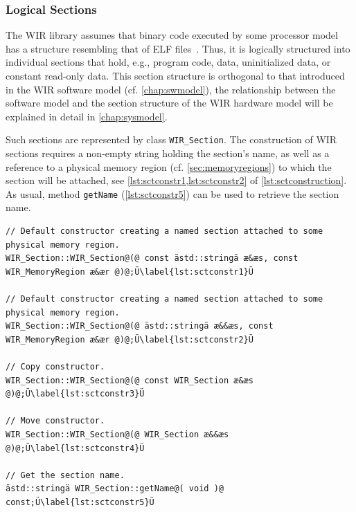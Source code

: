 \subsubsection{Logical Sections}
\label{sssec:sections}

The \gls{WIR} library assumes that binary code executed by some processor model has a structure resembling that of \gls{ELF} files~\cite{elf95}.
Thus, it is logically structured into individual sections that hold, e.g., program code, data, uninitialized data, or constant read-only data.
This section structure is orthogonal to that introduced in the \gls{WIR} software model (cf. \cref{chap:swmodel}), the relationship between the software model and the section structure of the \gls{WIR} hardware model will be explained in detail in \cref{chap:sysmodel}.

Such sections are represented by class \texttt{WIR\_Section}.
The construction of \gls{WIR} sections requires a non-empty string holding the section's name, as well as a reference to a physical memory region (cf. \cref{sec:memoryregions}) to which the section will be attached, see \cref{lst:sctconstr1,lst:sctconstr2} of \cref{lst:sctconstruction}.
As usual, method \texttt{getName} (\cref{lst:sctconstr5}) can be used to retrieve the section name.

\begin{lstlisting}[style=code,float=ht,caption={Constructors and Methods for Name Handling of Class \texttt{WIR\_Section}},label=lst:sctconstruction]
// Default constructor creating a named section attached to some physical memory region.
WIR_Section::WIR_Section@(@ const ästd::stringä æ&æs, const WIR_MemoryRegion æ&ær @)@;Ü\label{lst:sctconstr1}Ü

// Default constructor creating a named section attached to some physical memory region.
WIR_Section::WIR_Section@(@ ästd::stringä æ&&æs, const WIR_MemoryRegion æ&ær @)@;Ü\label{lst:sctconstr2}Ü

// Copy constructor.
WIR_Section::WIR_Section@(@ const WIR_Section æ&æs @)@;Ü\label{lst:sctconstr3}Ü

// Move constructor.
WIR_Section::WIR_Section@(@ WIR_Section æ&&æs @)@;Ü\label{lst:sctconstr4}Ü

// Get the section name.
ästd::stringä WIR_Section::getName@( void )@ const;Ü\label{lst:sctconstr5}Ü
\end{lstlisting}

